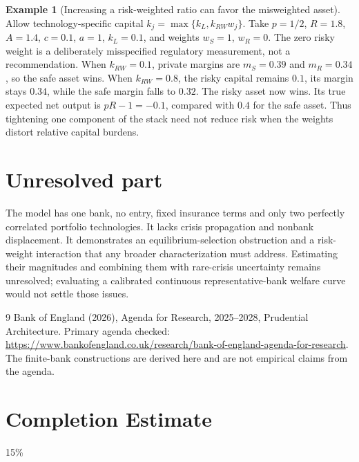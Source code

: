 \documentclass[11pt]{article}
\theoremstyle{definition}
\newtheorem{example}{Example}
\begin{document}
\begin{example}[Increasing a risk-weighted ratio can favor the misweighted asset]
Allow technology-specific capital $k_j=\max\{k_L,k_{RW}w_j\}$. Take $p=1/2$, $R=1.8$, $A=1.4$, $c=0.1$, $a=1$, $k_L=0.1$, and weights $w_S=1$, $w_R=0$. The zero risky weight is a deliberately misspecified regulatory measurement, not a recommendation. When $k_{RW}=0.1$, private margins are $m_S=0.39$ and $m_R=0.34$, so the safe asset wins. When $k_{RW}=0.8$, the risky capital remains $0.1$, its margin stays $0.34$, while the safe margin falls to $0.32$. The risky asset now wins. Its true expected net output is $pR-1=-0.1$, compared with $0.4$ for the safe asset. Thus tightening one component of the stack need not reduce risk when the weights distort relative capital burdens.
\end{example}

\section*{Unresolved part}
The model has one bank, no entry, fixed insurance terms and only two perfectly correlated portfolio technologies. It lacks crisis propagation and nonbank displacement. It demonstrates an equilibrium-selection obstruction and a risk-weight interaction that any broader characterization must address. Estimating their magnitudes and combining them with rare-crisis uncertainty remains unresolved; evaluating a calibrated continuous representative-bank welfare curve would not settle those issues.
\begin{thebibliography}{9}
 Bank of England (2026), Agenda for Research, 2025--2028, Prudential Architecture. Primary agenda checked: \url{https://www.bankofengland.co.uk/research/bank-of-england-agenda-for-research}. The finite-bank constructions are derived here and are not empirical claims from the agenda.
\end{thebibliography}

\section{Completion Estimate}
15\%
\end{document}
